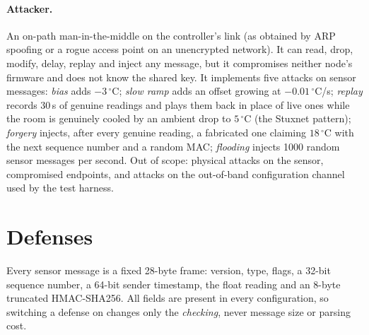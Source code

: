 \documentclass[10pt,twocolumn]{article}
\begin{document}
\paragraph{Attacker.} An on-path man-in-the-middle on the controller's link
(as obtained by ARP spoofing or a rogue access point on an unencrypted network).
It can read, drop, modify, delay, replay and inject any message, but it
compromises neither node's firmware and does not know the shared key. It
implements five attacks on sensor messages:
\emph{bias} adds $-3\,^\circ$C; \emph{slow ramp} adds an offset growing at
$-0.01\,^\circ$C/s; \emph{replay} records 30\,s of genuine readings and plays
them back in place of live ones while the room is genuinely cooled by an
ambient drop to $5\,^\circ$C (the Stuxnet pattern); \emph{forgery} injects,
after every genuine reading, a fabricated one claiming $18\,^\circ$C with the
next sequence number and a random MAC; \emph{flooding} injects 1000 random
sensor messages per second. Out of scope: physical attacks on the sensor,
compromised endpoints, and attacks on the out-of-band configuration channel
used by the test harness.

\section{Defenses}
Every sensor message is a fixed 28-byte frame: version, type, flags, a 32-bit
sequence number, a 64-bit sender timestamp, the float reading and an 8-byte
truncated HMAC-SHA256. All fields are present in every configuration, so
switching a defense on changes only the \emph{checking}, never message size or
parsing cost.
\end{document}
